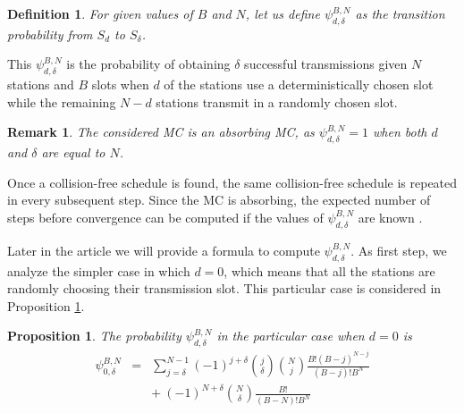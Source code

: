 \documentclass[journal]{IEEEtran}
\newtheorem{definition}{Definition}
\newtheorem{proposition}{Proposition}
\newtheorem{remark}{Remark}
\begin{document}
\begin{definition}
For given values of $B$ and $N$, let us define $\psi_{d,\delta}^{B,N}$ as the transition probability from $S_d$ to $S_\delta$. 
\end{definition}

This $\psi_{d,\delta}^{B,N}$ is the probability of obtaining $\delta$ successful transmissions given $N$ stations and $B$ slots when $d$ of the stations use a deterministically chosen slot while the remaining $N-d$ stations transmit in a randomly chosen slot.

\begin{remark}
The considered MC is an absorbing MC, as $\psi_{d,\delta}^{B,N}=1$ when both $d$ and $\delta$ are equal to $N$.
\end{remark}

Once a collision-free schedule is found, the same collision-free schedule is repeated in every subsequent step.
Since the MC is absorbing, the expected number of steps before convergence can be computed if the values of $\psi_{d,\delta}^{B,N}$ are known \cite{grinstead1997ip}.

Later in the article we will provide a formula to compute $\psi_{d,\delta}^{B,N}$.
As first step, we analyze the simpler case in which $d=0$, which means that all the stations are randomly choosing their transmission slot. 
This particular case is considered in Proposition \ref{pro:zero_case}.

\begin{proposition}
\label{pro:zero_case}
The probability $\psi^{B,N}_{d,\delta}$ in the particular case when $d=0$ is 
\setlength{\arraycolsep}{0.0em}
\begin{eqnarray}
\psi^{B,N}_{0,\delta} & {}={} &\sum_{j=\delta}^{N-1} (-1)^{j+\delta}\binom{j}{\delta} \binom{N}{j}\frac{B! (B-j)^{N-j}}{(B-j)! B^N} \nonumber\\
&&{+}\:(-1)^{N+\delta}\binom{N}{\delta}\frac{B!}{(B-N)!B^N}
\label{eq:psi_zero}
\end{eqnarray}
\end{proposition}
\end{document}
